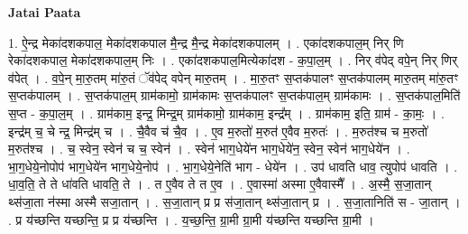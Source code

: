 \documentclass[17pt]{extarticle}
\begin{document}
\textbf{Jatai Paata} \newline

1. ऐ॒न्द्र मेका॑दशकपाल॒ मेका॑दशकपाल मै॒न्द्र मै॒न्द्र मेका॑दशकपालम् । . एका॑दशकपाल॒म् निर् णि रेका॑दशकपाल॒ मेका॑दशकपाल॒म् निः । . एका॑दशकपाल॒मित्येका॑दश - क॒पा॒ल॒म् । . निर् व॑पेद् वपे॒न् निर् णिर् व॑पेत् । . व॒पे॒न् मा॒रु॒तम् मा॑रु॒तं ॅव॑पेद् वपेन् मारु॒तम् । . मा॒रु॒तꣳ स॒प्तक॑पालꣳ स॒प्तक॑पालम् मारु॒तम् मा॑रु॒तꣳ स॒प्तक॑पालम् । . स॒प्तक॑पाल॒म् ग्राम॑कामो॒ ग्राम॑कामः स॒प्तक॑पालꣳ स॒प्तक॑पाल॒म् ग्राम॑कामः । . स॒प्तक॑पाल॒मिति॑ स॒प्त - क॒पा॒ल॒म् । . ग्राम॑काम॒ इन्द्र॒ मिन्द्र॒म् ग्राम॑कामो॒ ग्राम॑काम॒ इन्द्र᳚म् । . ग्राम॑काम॒ इति॒ ग्राम॑ - का॒मः॒ । . इन्द्र॑म् च॒ चे न्द्र॒ मिन्द्र॑म् च । . चै॒वैव च॑ चै॒व । . ए॒व म॒रुतो॑ म॒रुत॑ ए॒वैव म॒रुतः॑ । . म॒रुत॑श्च च म॒रुतो॑ म॒रुत॑श्च । . च॒ स्वेन॒ स्वेन॑ च च॒ स्वेन॑ । . स्वेन॑ भाग॒धेये॑न भाग॒धेये॑न॒ स्वेन॒ स्वेन॑ भाग॒धेये॑न । . भा॒ग॒धेये॒नोपोप॑ भाग॒धेये॑न भाग॒धेये॒नोप॑ । . भा॒ग॒धेये॒नेति॑ भाग - धेये॑न । . उप॑ धावति धाव॒ त्युपोप॑ धावति । . धा॒व॒ति॒ ते ते धा॑वति धावति॒ ते । . त ए॒वैव ते त ए॒व । . ए॒वास्मा॑ अस्मा ए॒वैवास्मै᳚ । . अ॒स्मै॒ स॒जा॒तान् थ्स॑जा॒ता न॑स्मा अस्मै सजा॒तान् । . स॒जा॒तान् प्र प्र स॑जा॒तान् थ्स॑जा॒तान् प्र । . स॒जा॒तानिति॑ स - जा॒तान् । . प्र य॑च्छन्ति यच्छन्ति॒ प्र प्र य॑च्छन्ति । . य॒च्छ॒न्ति॒ ग्रा॒मी ग्रा॒मी य॑च्छन्ति यच्छन्ति ग्रा॒मी । \newline
\end{document}
